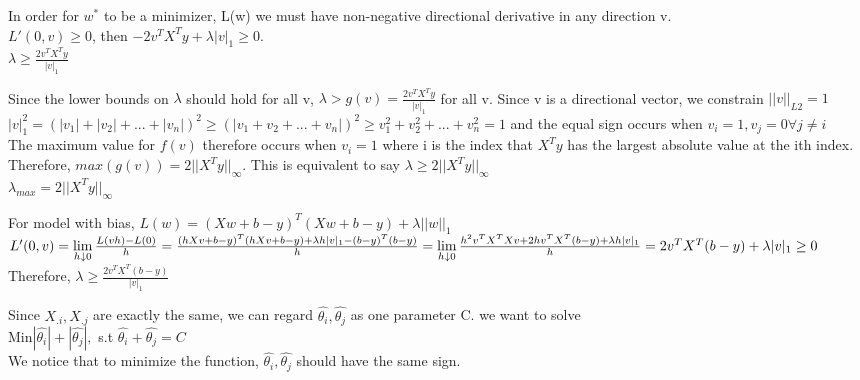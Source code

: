 \documentclass{article}
\newenvironment{problem}[2][$\bullet$]{\begin{trivlist}\large
		\item[\hskip \labelsep {\bfseries #1}\hskip \labelsep {\bfseries #2.}]}  {\end{trivlist}}
\newenvironment{sub}[2][$-$]{\begin{trivlist}
		\item[\hskip \labelsep {\bfseries #1}\hskip \labelsep {\bfseries #2.}]}  {\end{trivlist}}
\begin{document}
\begin{sub}{3.1.2}
\end{sub}
In order for $w^*$ to be a minimizer, L(w) we must have non-negative directional derivative in any direction v. \\
$L'(0,v) \geq 0$, then $ -2v^TX^Ty + \lambda |v|_1 \geq 0 $.\\
$\lambda \geq \frac{2v^TX^Ty}{|v|_1} $
\begin{sub}{3.1.3}
\end{sub}
Since the lower bounds on $\lambda$ should  hold for all v, $\lambda > g(v) =\frac{2v^TX^Ty}{|v|_1} $ for all v. Since v is a directional vector, we constrain $||v||_{L2} = 1$\\
$|v|^2_1 = (|v_1| + |v_2| + ... + |v_n|)^2 \geq  (|v_1 + v_2 +... + v_n|)^2  \geq v_1^2 + v_2^2 +... + v_n^2 = 1$ and the equal sign occurs when $v_i = 1, v_j = 0 \forall j \neq i$\\
The maximum value for $f(v)$ therefore occurs when $v_i = 1$ where i is the index that $X^Ty$ has the largest absolute value at the ith index.\\  Therefore, $max(g(v)) =   2||X^Ty||_\infty $. This is equivalent to say $\lambda \geq 2||X^Ty||_\infty $\\
$\lambda_{max} = 2||X^Ty||_\infty $

\begin{sub}{3.1.4}
	\end{sub}
For model with bias, $L(w) = (Xw + b-y)^T(Xw+b-y) + \lambda ||w||_1$\\
$L'(0,v) = \lim\limits_{h \downarrow0 } \frac{L(vh) - L(0)}{h} = \frac{(hXv +b - y)^T(hXv +b -y) + \lambda h |v|_1 - (b-y)^T(b-y)}{h}\\  =\lim\limits_{h \downarrow0 } \frac{h^2v^TX^TXv + 2hv^TX^T(b-y)  + \lambda h|v|_1}{h}  =2v^TX^T(b-y)  + \lambda |v|_1 \geq 0$\\
Therefore, $\lambda \geq \frac{2v^TX^T(b-y)}{|v|_1 }$

\begin{problem}{3.2 Feature Correlation}
\end{problem}
\begin{sub}{3.2.1}
\end{sub}
Since $X_{.i}, X_{.j}$ are exactly the same, we can regard $\hat{\theta_i},\hat{\theta_j}$ as one parameter C. we want to solve  \\
Min$ |\hat{\theta_i}| +|\hat{\theta_j}|,$ s.t $ \hat{\theta_i} +\hat{\theta_j} = C$\\
We notice that to minimize the function, $\hat{\theta_i}, \hat{\theta_j}$ should have the same sign.
\end{document}
